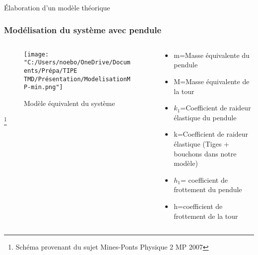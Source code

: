 \documentclass{beamer}
\begin{document}
\begin{frame}{Élaboration d'un modèle théorique}
	\frametitle{Modélisation du système avec pendule}
	\begin{columns}
		\begin{column}{0.5\textwidth}
			\begin{figure}
				\centering
				\texttt{[image: "C:/Users/noebo/OneDrive/Documents/Prépa/TIPE TMD/Présentation/ModelisationMP-min.png"]}
				\caption{Modèle équivalent du système}
			\end{figure}
		\footnote{\tiny Schéma provenant du sujet Mines-Ponts Physique 2 MP 2007}
		\end{column}
		\begin{column}{0.5\textwidth}
			\begin{itemize}
				\item m=Masse équivalente du pendule
				\item M=Masse équivalente de la tour
				\item $k_{1}$=Coefficient de raideur élastique du pendule
				\item k=Coefficient de raideur élastique (Tiges + bouchons dans notre modèle)
				\item $h_{1}$= coefficient de frottement du pendule 
				\item h=coefficient de frottement de la tour
			\end{itemize}	
		\end{column}
	\end{columns}
	
\end{frame}

\end{document}
